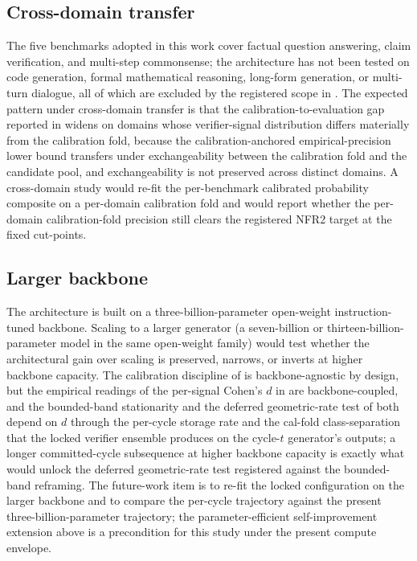\subsection{Cross-domain transfer}
\label{sec:future-transfer}

The five benchmarks adopted in this work cover factual question answering, claim verification, and multi-step commonsense; the architecture has not been tested on code generation, formal mathematical reasoning, long-form generation, or multi-turn dialogue, all of which are excluded by the registered scope in . The expected pattern under cross-domain transfer is that the calibration-to-evaluation gap reported in  widens on domains whose verifier-signal distribution differs materially from the calibration fold, because the calibration-anchored empirical-precision lower bound transfers under exchangeability between the calibration fold and the candidate pool, and exchangeability is not preserved across distinct domains. A cross-domain study would re-fit the per-benchmark calibrated probability composite on a per-domain calibration fold and would report whether the per-domain calibration-fold precision still clears the registered NFR2 target at the fixed cut-points.

\subsection{Larger backbone}
\label{sec:future-backbone}

The architecture is built on a three-billion-parameter open-weight instruction-tuned backbone. Scaling to a larger generator (a seven-billion or thirteen-billion-parameter model in the same open-weight family) would test whether the architectural gain over scaling is preserved, narrows, or inverts at higher backbone capacity. The calibration discipline of  is backbone-agnostic by design, but the empirical readings of the per-signal Cohen's $d$ in  are backbone-coupled, and the bounded-band stationarity and the deferred geometric-rate test of  both depend on $d$ through the per-cycle storage rate and the cal-fold class-separation that the locked verifier ensemble produces on the cycle-$t$ generator's outputs; a longer committed-cycle subsequence at higher backbone capacity is exactly what would unlock the deferred geometric-rate test registered against the bounded-band reframing. The future-work item is to re-fit the locked configuration on the larger backbone and to compare the per-cycle trajectory against the present three-billion-parameter trajectory; the parameter-efficient self-improvement extension above is a precondition for this study under the present compute envelope.

